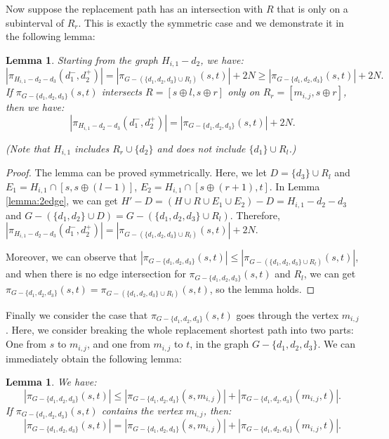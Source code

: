 \documentclass[11pt]{article}
\theoremstyle{plain}
\newtheorem{lemma}[theorem]{Lemma}
\theoremstyle{definition}
\newcommand{\set}[1]{\{ #1 \}}
\newcommand{\og}[3]{\pi_{G-#3}\left(#1,#2\right)}
\begin{document}
Now suppose the replacement path has an intersection with $R$ that is only on a subinterval of $R_r$. This is exactly the symmetric case and we demonstrate it in the following lemma:

\begin{lemma}\label{2edgecase3}
    Starting from the graph $H_{i,1} - d_2$, we have:
    \[|\pi_{H_{i,1}-d_2-d_3}(d_1^-,d_2^+)| = |\og{s}{t}{(\set{d_1, d_2, d_3}\cup R_l)}| + 2N \geq |\og{s}{t}{\set{d_1, d_2, d_3}}| + 2N.\]
    If $\og{s}{t}{\set{d_1, d_2, d_3}}$ intersects $R = [s \oplus l, s \oplus r]$ only on $R_r = [m_{i,j},s \oplus r]$, then we have:
    \[|\pi_{H_{i,1}-d_2-d_3}(d_1^-,d_2^+)| = |\og{s}{t}{\set{d_1, d_2, d_3}}| + 2N.\]
    
    (Note that $H_{i,1}$ includes $R_r \cup \set{d_2}$ and does not include $\set{d_1} \cup R_l$.)
\end{lemma}

\begin{proof}
    The lemma can be proved symmetrically. Here, we let $D = \set{d_3} \cup R_l$ and $E_1=H_{i,1} \cap [s,s\oplus(l-1)]$, $E_2=H_{i,1} \cap [s\oplus(r+1),t]$. In Lemma \ref{lemma:2edge}, we can get $H'-D = (H \cup R \cup E_1 \cup E_2)-D = H_{i,1}-d_2-d_3$ and $G-(\set{d_1, d_2}\cup D) = G- (\set{d_1, d_2, d_3} \cup R_l)$. Therefore, $|\pi_{H_{i,1}-d_2-d_3}(d_1^-,d_2^+)| = |\og{s}{t}{(\set{d_1, d_2, d_3}\cup R_l)}| + 2N$.
    
    Moreover, we can observe that $|\og{s}{t}{\set{d_1, d_2, d_3}}| \leq |\og{s}{t}{(\set{d_1, d_2, d_3} \cup R_l)}|$, and when there is no edge intersection for $\og{s}{t}{\set{d_1, d_2, d_3}}$ and $R_l$, we can get $\og{s}{t}{\set{d_1, d_2, d_3}} = \og{s}{t}{(\set{d_1, d_2, d_3} \cup R_l)}$, so the lemma holds.
\end{proof}

Finally we consider the case that $\og{s}{t}{\set{d_1, d_2, d_3}}$ goes through the vertex $m_{i,j}$. Here, we consider breaking the whole replacement shortest path into two parts: One from $s$ to $m_{i,j}$, and one from $m_{i,j}$ to $t$, in the graph $G-\set{d_1, d_2, d_3}$. We can immediately obtain the following lemma:

\begin{lemma}\label{2edgecase4}
    We have:
    \[|\og{s}{t}{\set{d_1, d_2, d_3}}| \leq |\og{s}{m_{i,j}}{\set{d_1, d_2, d_3}}| + |\og{m_{i,j}}{t}{\set{d_1, d_2, d_3}}|.\]
    If $\og{s}{t}{\set{d_1, d_2, d_3}}$ contains the vertex $m_{i,j}$, then: 
    \[|\og{s}{t}{\set{d_1, d_2, d_3}}| = |\og{s}{m_{i,j}}{\set{d_1, d_2, d_3}}| + |\og{m_{i,j}}{t}{\set{d_1, d_2, d_3}}|.\]
\end{lemma}
\end{document}
